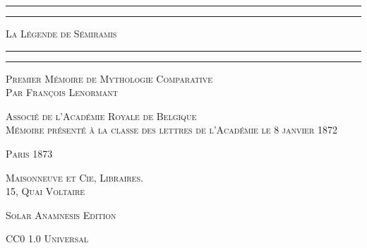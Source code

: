 \documentclass[a4paper, 11pt, oneside]{article}
\begin{document}
\begin{titlepage} %
	\centering %

	
	\rule{\textwidth}{1.6pt}\vspace*{-\baselineskip}\vspace*{2pt} %
	\rule{\textwidth}{0.4pt} %
	
	\vspace{0.2\baselineskip} %
	
	{\scshape\LARGE La Légende de Sémiramis}
	
	\vspace{0.1\baselineskip} %

	\rule{\textwidth}{0.4pt}\vspace*{-\baselineskip}\vspace{3.2pt} %
	\rule{\textwidth}{1.6pt} %
	
	\vspace{0.1\baselineskip} %
	
	
	{\scshape \footnotesize Premier Mémoire de Mythologie Comparative 	\vspace{0.5\baselineskip}\\\large Par François Lenormant} %
	
	\vspace*{0.2\baselineskip} %
	
        {\scshape\footnotesize Associé de l'Académie Royale de Belgique\\\footnotesize Mémoire présenté à la classe des lettres de l'Académie le 8 janvier 1872} %
    
        \vspace*{\fill}

	\vspace{0.2\baselineskip}

	{\footnotesize\scshape Paris 1873}
	
	{\footnotesize\scshape{Maisonneuve et Cie, Libraires. \\ 15, Quai Voltaire}}
	
	\vspace{0.1\baselineskip} %

        {\scshape\footnotesize Solar Anamnesis Edition}  %
	
	{\scshape\footnotesize CC0 1.0 Universal} %
\end{titlepage}
\setlength{\parskip}{1mm plus1mm minus1mm}
\clearpage
\tableofcontents
\clearpage
\small
\end{document}
